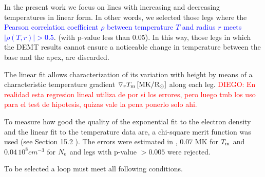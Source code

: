 \documentclass[namedreferences]{solarphysics}
\newcommand{\mrsun}{{\rm R_\odot}}
\newcommand{\MK}{{\rm MK}}
\newcommand{\dr}{\triangledown_r}
\newcommand{\Tm}{T_{\rm m}}
\newcommand{\Ne}{N_{\rm e}}
\newcommand{\rhoTr}{\rho(T,r)}
\def\diego#1{\textcolor{red}{DIEGO: #1}}
\def\albert#1{\textcolor{blue}{#1}}
\def\temp#1{\textcolor{mygray}{#1}}
\begin{document}
\begin{article}
In the present work we focus on lines with increasing and decreasing temperatures in linear form. In other words, we selected those legs where the \albert{Pearson correlation coefficient $\rho$ between temperature $T$ and radius $r$ meets $|\rhoTr| > 0.5$}. \temp{(with p-value less than 0.05)}. In this way, those legs in which the DEMT results cannot ensure a noticeable change in temperature between the base and the apex, are discarded.


The linear fit allows characterization of its variation with height by means of a characteristic temperature gradient $\dr \Tm\,[\MK/\mrsun]$ along each leg.
\diego{En realidad esta regresion lineal utiliza de por si los errores, pero luego tmb los uso para el test de hipotesis, quizas vale la pena ponerlo solo ahi.}


To measure how good the quality of the exponential fit to the electron density and the linear fit to the temperature data are, a chi-square merit function was used (see Section 15.2 \citet{recipes}). The errors were estimated in \citet{lloveras_2017}, $0.07$ MK for $\Tm$ and $0.04\,10^8 cm^{-3}$ for $\Ne$ and legs with p-value $>0.005$ were rejected. 



To be selected a loop must meet all following conditions.

\begin{enumerate}


\end{enumerate}
\end{article}
\end{document}
